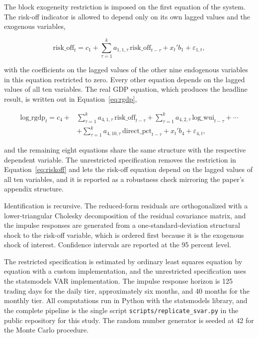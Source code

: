 The block exogeneity restriction is imposed on the first equation of the system. The risk-off indicator is allowed to depend only on its own lagged values and the exogenous variables,

\begin{equation}
  \text{risk\_off}_t = c_1 + \sum_{\tau = 1}^{k} a_{1,1,\tau}\, \text{risk\_off}_{t-\tau} + x_t' b_1 + \varepsilon_{1,t},
  \label{eq:riskoff}
\end{equation}

with the coefficients on the lagged values of the other nine endogenous variables in this equation restricted to zero. Every other equation depends on the lagged values of all ten variables. The real GDP equation, which produces the headline result, is written out in Equation~\eqref{eq:rgdp},

\begin{equation}
\begin{split}
  \text{log\_rgdp}_t = c_4 + & \sum_{\tau = 1}^{k} a_{4,1,\tau}\, \text{risk\_off}_{t-\tau} + \sum_{\tau = 1}^{k} a_{4,2,\tau}\, \text{log\_wui}_{t-\tau} + \cdots \\
  & + \sum_{\tau = 1}^{k} a_{4,10,\tau}\, \text{direct\_pct}_{t-\tau} + x_t' b_4 + \varepsilon_{4,t},
\end{split}
  \label{eq:rgdp}
\end{equation}

and the remaining eight equations share the same structure with the respective dependent variable. The unrestricted specification removes the restriction in Equation~\eqref{eq:riskoff} and lets the risk-off equation depend on the lagged values of all ten variables, and it is reported as a robustness check mirroring the paper's appendix structure.

Identification is recursive. The reduced-form residuals are orthogonalized with a lower-triangular Cholesky decomposition of the residual covariance matrix, and the impulse responses are generated from a one-standard-deviation structural shock to the risk-off variable, which is ordered first because it is the exogenous shock of interest. Confidence intervals are reported at the 95 percent level.

The restricted specification is estimated by ordinary least squares equation by equation with a custom implementation, and the unrestricted specification uses the statsmodels VAR implementation. The impulse response horizon is 125 trading days for the daily tier, approximately six months, and 40 months for the monthly tier. All computations run in Python with the statsmodels library, and the complete pipeline is the single script \texttt{scripts/replicate\_svar.py} in the public repository for this study. The random number generator is seeded at 42 for the Monte Carlo procedure.

